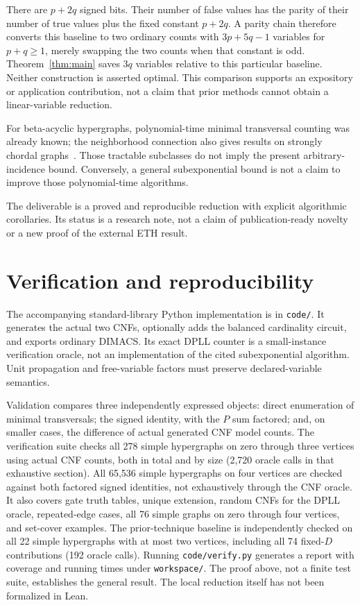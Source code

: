 \documentclass[11pt]{article}
\theoremstyle{remark}\newtheorem{remark}[theorem]{Remark}
\begin{document}
There are $p+2q$ signed bits. Their number of false values has the parity of
their number of true values plus the fixed constant $p+2q$. A parity chain
therefore converts this baseline to two ordinary counts with
$3p+5q-1$ variables for $p+q\ge1$, merely swapping the two counts when that
constant is odd. Theorem~\ref{thm:main} saves $3q$ variables relative to this
particular baseline. Neither construction is asserted optimal. This comparison
supports an expository or application contribution, not a claim that prior
methods cannot obtain a linear-variable reduction.

For beta-acyclic hypergraphs, polynomial-time minimal transversal counting
was already known; the neighborhood connection also gives results on strongly
chordal graphs~\cite{bbcw}. Those tractable subclasses do not imply the present
arbitrary-incidence bound. Conversely, a general subexponential bound is not
a claim to improve those polynomial-time algorithms.

The deliverable is a proved and reproducible reduction with explicit
algorithmic corollaries. Its status is a research note, not a claim of
publication-ready novelty or a new proof of the external ETH result.

\section{Verification and reproducibility}\label{sec:verify}
The accompanying standard-library Python implementation is in
\texttt{code/}. It generates the actual two CNFs, optionally adds the balanced
cardinality circuit, and exports ordinary DIMACS. Its exact DPLL counter is
a small-instance verification oracle, not an implementation of the cited
subexponential algorithm. Unit propagation and free-variable factors must
preserve declared-variable semantics.

Validation compares three independently expressed objects: direct enumeration
of minimal transversals; the signed identity, with the $P$ sum factored; and,
on smaller cases, the difference of actual generated CNF model counts.
The verification suite checks all 278 simple hypergraphs on zero through three
vertices using actual CNF counts, both in total and by size (2,720 oracle
calls in that exhaustive section). All 65,536 simple hypergraphs on four
vertices are checked against both factored signed identities, not exhaustively
through the CNF oracle. It also covers gate truth tables, unique extension,
random CNFs for the DPLL oracle, repeated-edge cases, all 76 simple graphs on
zero through four vertices, and set-cover examples. The prior-technique
baseline is independently checked on all 22 simple hypergraphs with at most
two vertices, including all 74 fixed-$D$ contributions (192 oracle calls).
Running \texttt{code/verify.py} generates a report with coverage and running times
under \texttt{workspace/}.
The proof above, not a finite test suite, establishes the general result.
The local reduction itself has not been formalized in Lean.
\end{document}
